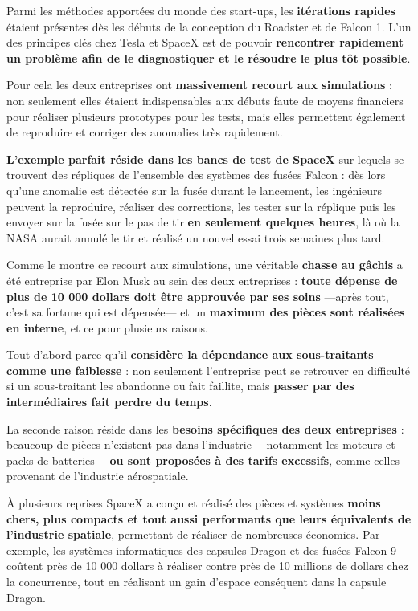 \vspace{5mm}

Parmi les méthodes apportées du monde des start-ups, les \textbf{itérations rapides} étaient présentes dès les débuts de la conception du Roadster et de Falcon 1. L'un des principes clés chez Tesla et SpaceX est de pouvoir \textbf{rencontrer rapidement un problème afin de le diagnostiquer et le résoudre le plus tôt possible}.

Pour cela les deux entreprises ont \textbf{massivement recourt aux simulations} : non seulement elles étaient indispensables aux débuts faute de moyens financiers pour réaliser plusieurs prototypes pour les tests, mais elles permettent également de reproduire et corriger des anomalies très rapidement.

\textbf{L'exemple parfait réside dans les bancs de test de SpaceX} sur lequels se trouvent des répliques de l'ensemble des systèmes des fusées Falcon : dès lors qu'une anomalie est détectée sur la fusée durant le lancement, les ingénieurs peuvent la reproduire, réaliser des corrections, les tester sur la réplique puis les envoyer sur la fusée sur le pas de tir \textbf{en seulement quelques heures}, là où la NASA aurait annulé le tir et réalisé un nouvel essai trois semaines plus tard.

\vspace{5mm}

Comme le montre ce recourt aux simulations, une véritable \textbf{chasse au gâchis} a été entreprise par Elon Musk au sein des deux entreprises : \textbf{toute dépense de plus de 10 000 dollars doit être approuvée par ses soins} ---après tout, c'est sa fortune qui est dépensée--- et un \textbf{maximum des pièces sont réalisées en interne}, et ce pour plusieurs raisons.

Tout d'abord parce qu'il \textbf{considère la dépendance aux sous-traitants comme une faiblesse} : non seulement l'entreprise peut se retrouver en difficulté si un sous-traitant les abandonne ou fait faillite, mais \textbf{passer par des intermédiaires fait perdre du temps}.

La seconde raison réside dans les \textbf{besoins spécifiques des deux entreprises} : beaucoup de pièces n'existent pas dans l'industrie ---notamment les moteurs et packs de batteries--- \textbf{ou sont proposées à des tarifs excessifs}, comme celles provenant de l'industrie aérospatiale.

À plusieurs reprises SpaceX a conçu et réalisé des pièces et systèmes \textbf{moins chers, plus compacts et tout aussi performants que leurs équivalents de l'industrie spatiale}, permettant de réaliser de nombreuses économies. Par exemple, les systèmes informatiques des capsules Dragon et des fusées Falcon 9 coûtent près de 10 000 dollars à réaliser contre près de 10 millions de dollars chez la concurrence, tout en réalisant un gain d'espace conséquent dans la capsule Dragon.

